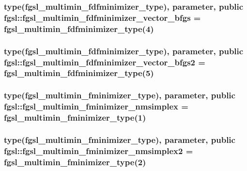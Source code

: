 \subsubsection[{fgsl\+\_\+multimin\+\_\+fdfminimizer\+\_\+vector\+\_\+bfgs}]{\setlength{\rightskip}{0pt plus 5cm}type({\bf fgsl\+\_\+multimin\+\_\+fdfminimizer\+\_\+type}), parameter, public fgsl\+::fgsl\+\_\+multimin\+\_\+fdfminimizer\+\_\+vector\+\_\+bfgs = {\bf fgsl\+\_\+multimin\+\_\+fdfminimizer\+\_\+type}(4)}\label{namespacefgsl_a98f35d82aab613681b886c2582cb98d2}
\hypertarget{namespacefgsl_a6cc130b66b81b66a085cfb1882c711e6}{}
\subsubsection[{fgsl\+\_\+multimin\+\_\+fdfminimizer\+\_\+vector\+\_\+bfgs2}]{\setlength{\rightskip}{0pt plus 5cm}type({\bf fgsl\+\_\+multimin\+\_\+fdfminimizer\+\_\+type}), parameter, public fgsl\+::fgsl\+\_\+multimin\+\_\+fdfminimizer\+\_\+vector\+\_\+bfgs2 = {\bf fgsl\+\_\+multimin\+\_\+fdfminimizer\+\_\+type}(5)}\label{namespacefgsl_a6cc130b66b81b66a085cfb1882c711e6}
\hypertarget{namespacefgsl_ab2e841755e0db0b740c913a9ca231417}{}
\subsubsection[{fgsl\+\_\+multimin\+\_\+fminimizer\+\_\+nmsimplex}]{\setlength{\rightskip}{0pt plus 5cm}type({\bf fgsl\+\_\+multimin\+\_\+fminimizer\+\_\+type}), parameter, public fgsl\+::fgsl\+\_\+multimin\+\_\+fminimizer\+\_\+nmsimplex = {\bf fgsl\+\_\+multimin\+\_\+fminimizer\+\_\+type}(1)}\label{namespacefgsl_ab2e841755e0db0b740c913a9ca231417}
\hypertarget{namespacefgsl_a360e9e8ff70d499aedd5dbbdbdfd8404}{}
\subsubsection[{fgsl\+\_\+multimin\+\_\+fminimizer\+\_\+nmsimplex2}]{\setlength{\rightskip}{0pt plus 5cm}type({\bf fgsl\+\_\+multimin\+\_\+fminimizer\+\_\+type}), parameter, public fgsl\+::fgsl\+\_\+multimin\+\_\+fminimizer\+\_\+nmsimplex2 = {\bf fgsl\+\_\+multimin\+\_\+fminimizer\+\_\+type}(2)}\label{namespacefgsl_a360e9e8ff70d499aedd5dbbdbdfd8404}
\hypertarget{namespacefgsl_a1d64d873582c83a3e43c44d10ada296e}{}
